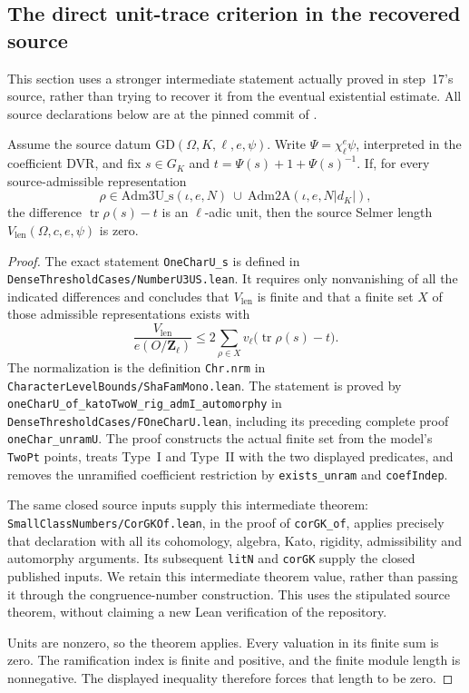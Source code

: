 \subsection{The direct unit-trace criterion in the recovered source}
\label{sec:step17-unit-interface}

This section uses a stronger intermediate statement actually proved in
step~17's source, rather than trying to recover it from the eventual
existential estimate. All source declarations below are at the pinned
commit of \cite{K17PinnedLeanMirror}.

\begin{lemma}[K17-S17-UNIT]\label{lem:step17-unit}
Assume the source datum $\mathrm{GD}(\Omega,K,\ell,e,\psi)$.
Write $\Psi=\chi_\ell^e\psi$, interpreted in the coefficient DVR, and
fix $s\in G_K$ and $t=\Psi(s)+1+\Psi(s)^{-1}$.
If, for every source-admissible representation
\[
 \rho\in\mathrm{Adm3U\_s}(\iota,e,N)
       \ \cup\ \mathrm{Adm2A}(\iota,e,N|d_K|),
\]
the difference $\operatorname{tr}\rho(s)-t$ is an $\ell$-adic unit,
then the source Selmer length $V_{\mathrm{len}}(\Omega,c,e,\psi)$ is zero.
\end{lemma}

\begin{proof}
The exact statement \texttt{OneCharU\_s} is defined in
\texttt{DenseThresholdCases/NumberU3US.lean}.
It requires only nonvanishing of all the indicated differences and concludes
that $V_{\mathrm{len}}$ is finite and that a finite set $X$ of those
admissible representations exists with
\[
 \frac{V_{\mathrm{len}}}{e(O/\mathbf Z_\ell)}
 \le 2\sum_{\rho\in X}
       v_\ell\bigl(\operatorname{tr}\rho(s)-t\bigr).
\]
The normalization is the definition \texttt{Chr.nrm} in
\texttt{CharacterLevelBounds/ShaFamMono.lean}.
The statement is proved by
\texttt{oneCharU\_of\_katoTwoW\_rig\_admI\_automorphy} in
\texttt{DenseThresholdCases/FOneCharU.lean}, including its preceding
complete proof \texttt{oneChar\_unramU}. The proof constructs the actual
finite set from the model's \texttt{TwoPt} points, treats Type~I and
Type~II with the two displayed predicates, and removes the unramified
coefficient restriction by \texttt{exists\_unram} and
\texttt{coefIndep}.

The same closed source inputs supply this intermediate theorem:
\texttt{SmallClassNumbers/CorGKOf.lean}, in the proof of
\texttt{corGK\_of}, applies precisely that declaration with all its
cohomology, algebra, Kato, rigidity, admissibility and automorphy arguments.
Its subsequent \texttt{litN} and \texttt{corGK} supply the closed published
inputs. We retain this intermediate theorem value, rather than passing it
through the congruence-number construction. This uses the stipulated source
theorem, without claiming a new Lean verification of the repository.

Units are nonzero, so the theorem applies. Every valuation in its finite
sum is zero. The ramification index is finite and positive, and the finite
module length is nonnegative. The displayed inequality therefore forces
that length to be zero.
\end{proof}

